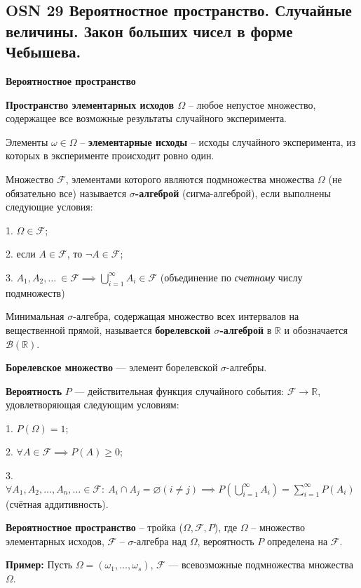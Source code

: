 \subsection*{OSN 29 Вероятностное пространство. Случайные величины. Закон больших чисел в форме Чебышева.}

\centerline{\textbf{Вероятностное пространство}}

\textbf{Пространство элементарных исходов $\Omega$} -- любое непустое множество, содержащее все возможные результаты случайного эксперимента.

Элементы $\omega \in \Omega$ -- \textbf{элементарные исходы} -- исходы случайного эксперимента, из которых в эксперименте происходит ровно один. 

Множество $\mathcal{F}$, элементами которого являются подмножества множества $\Omega$ (не обязательно все) называется \textbf{$\sigma$-алгеброй} (сигма-алгеброй), если выполнены следующие условия:

1. $\Omega \in \mathcal{F}$;

2. если $A \in \mathcal{F}$, то $\neg A \in \mathcal{F}$;

3. $A_1,A_2,\dots~\in \mathcal{F} \implies \bigcup_{i=1}^{\infty} A_i \in \mathcal{F}$ (объединение по \textit{счетному} числу подмножеств)


Минимальная $\sigma$-алгебра, содержащая множество всех интервалов на вещественной прямой, называется \textbf{борелевской $\sigma$-алгеброй} в $\mathbb{R}$ и обозначается $\mathcal{B}(\mathbb{R})$. 

\textbf{Борелевское множество} --- элемент борелевской $\sigma$-алгебры.

\textbf{Вероятность} $P$ --- действительная функция случайного события: $\mathcal{F} \rightarrow \mathbb{R}$, удовлетворяющая следующим условиям:

1. $P(\Omega) = 1$;

2.  $\forall A \in \mathcal{F}\implies P(A) \geqslant 0$;

3. $\forall A_1,A_2,\dots,A_n,\dots \in \mathcal{F}:~A_i \cap A_j = \varnothing (i \neq j) \implies P(\displaystyle\bigcup_{i=1}^{\infty}A_i) = \displaystyle\sum_{i=1}^{\infty}P(A_i)$ (счётная аддитивность).


\textbf{Вероятностное пространство} -- тройка ($\Omega, \mathcal{F}, P$), где $\Omega$ -- множество элементарных исходов, $\mathcal{F}$ -- $\sigma$-алгебра над $\Omega$, вероятность $P$ определена на $\mathcal{F}$.

\textbf{Пример: }
Пусть $\Omega = (\omega_1,\dots,\omega_s)$, $\mathcal{F}$ --- всевозможные подмножества множества $\Omega$.

